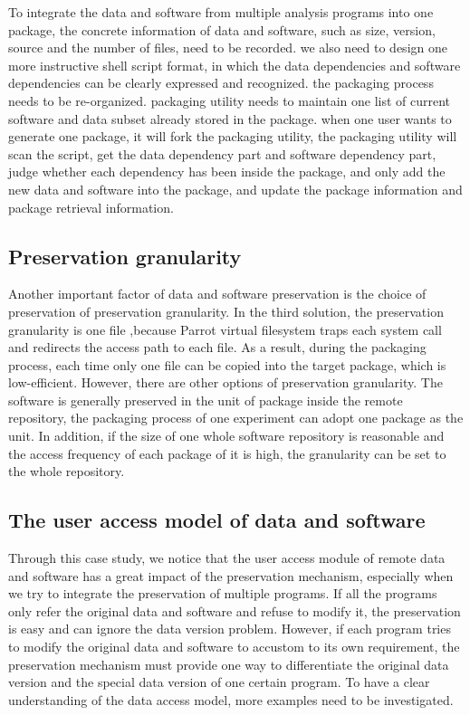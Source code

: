 \documentclass{article}
\begin{document}
To integrate the data and software from multiple analysis programs into one package, the concrete information of data and software, such as size, version, source and the number of files, need to be recorded. we also need to design one more instructive shell script format, in which the data dependencies and software dependencies can be clearly expressed and recognized. the packaging process needs to be re-organized. packaging utility needs to maintain one list of current software and data subset already stored in the package. when one user wants to generate one package, it will fork the packaging utility, the packaging utility will scan the script, get the data dependency part and software dependency part, judge whether each dependency has been inside the package, and only add the new data and software into the package, and update the package information and package retrieval information.

\subsection{Preservation granularity}
\indent Another important factor of data and software preservation is the choice of preservation of preservation granularity. In the third solution, the preservation granularity is one file ,because Parrot virtual filesystem traps each system call and redirects the access path to each file. As a result, during the packaging process, each time only one file can be copied into the target package, which is low-efficient. However, there are other options of preservation granularity. The software is generally preserved in the unit of package inside the remote repository, the packaging process of one experiment can adopt one package as the unit. In addition, if the size of one whole software repository is reasonable and the access frequency of each package of it is high, the granularity can be set to the whole repository.

\subsection{The user access model of data and software}
\indent Through this case study, we notice that the user access module of remote data and software has a great impact of the preservation mechanism, especially when we try to integrate the preservation of multiple programs. If all the programs only refer the original data and software and refuse to modify it, the preservation is easy and can ignore the data version problem. However, if each program tries to modify the original data and software to accustom to its own requirement, the preservation mechanism must provide one way to differentiate the original data version and the special data version of one certain program. To have a clear understanding of the data access model, more examples need to be investigated.
\end{document}
